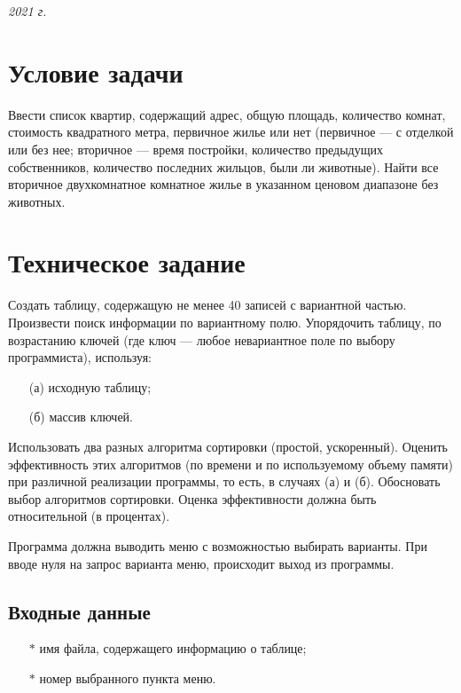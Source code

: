 \documentclass[a4paper,12pt]{extarticle}
\begin{document}
\vspace{7cm}
\begin{center} \textit{2021 г.} \end{center}
\thispagestyle{empty}
\newpage

\tableofcontents
\newpage

\section{Условие задачи}
Ввести  список  квартир,  содержащий  адрес,  общую  площадь, 
количество  комнат, стоимость  квадратного  метра,  первичное 
жилье или нет (первичное --- с отделкой или без нее;  вторичное ---
время  постройки,  количество  предыдущих  собственников, 
количество  последних  жильцов,  были  ли  животные).  Найти  все 
вторичное двухкомнатное комнатное жилье в указанном ценовом диапазоне 
без животных. 

\newpage

\section{Техническое задание}
Создать таблицу, содержащую не менее 40 записей с вариантной частью. Произвести 
поиск  информации  по  вариантному  полю.  Упорядочить  таблицу,  по  возрастанию  ключей 
(где  ключ --- любое  невариантное  поле  по  выбору  программиста),  используя:  
\begin{itemize}
    \item[(а)] исходную таблицу;
    \item[(б)] массив  ключей. 
\end{itemize}

Использовать  два  разных  алгоритма сортировки  (простой, 
ускоренный). Оценить  эффективность  этих  алгоритмов  (по  времени  и  по  используемому 
объему памяти) при различной реализации программы, то есть, в случаях (а) и (б). Обосновать 
выбор алгоритмов сортировки. Оценка эффективности должна быть относительной (в процентах).

Программа должна выводить меню с возможностью выбирать варианты. При вводе нуля на запрос варианта меню, происходит выход из программы.

\subsection{Входные данные}
\begin{itemize}
    \item[$*$] имя файла, содержащего информацию о таблице;
    \item[$*$] номер выбранного пункта меню.
\end{itemize}
\end{document}
